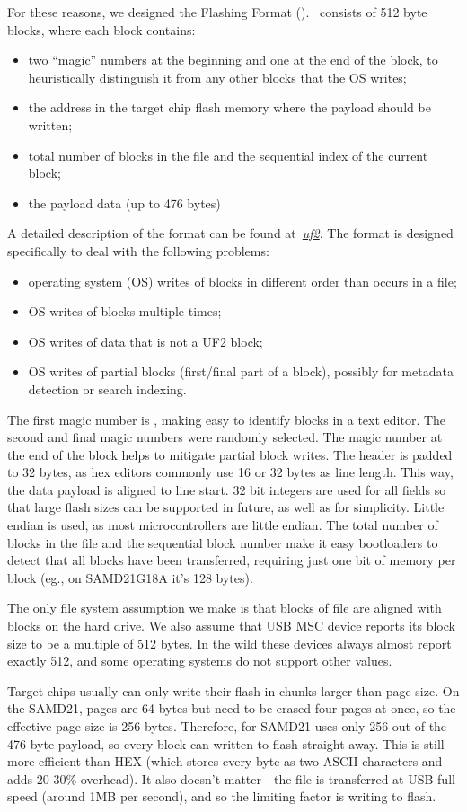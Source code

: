 For these reasons, we designed the Flashing Format (\UF). \ consists of 512 byte blocks, where each block contains:
\begin{itemize}
\item two ``magic'' numbers at the beginning and one at the end of the block,
to heuristically distinguish it from any other blocks that the OS writes;
\item the address in the target chip flash memory where the payload should be written;
\item total number of blocks in the file and the sequential index of the current block;
\item the payload data (up to 476 bytes)
\end{itemize}
A detailed description of the format can be found at~\emph{\href{https://github.com/microsoft/uf2}{uf2}}.
The format is designed specifically to deal with the following problems:
\begin{itemize}
\item operating system (OS) writes of blocks in different order than occurs in a file;
\item OS writes of blocks multiple times;
\item OS writes of data that is not a UF2 block;
\item OS writes of partial blocks (first/final part of a block), possibly for metadata detection or search indexing.
\end{itemize}

The first magic number is \texttt{\UFN}, making easy to identify \UF blocks in a text editor.
The second and final magic numbers were randomly selected.
The magic number at the end of the block helps to mitigate partial block writes.
The \UF header is padded to 32 bytes, as hex editors commonly use 16 or 32 bytes as line length. 
This way, the data payload is aligned to line start. 32 bit integers are used for all fields so that 
large flash sizes can be supported in future, as well as for simplicity.
Little endian is used, as most microcontrollers are little endian. 
The total number of blocks in the file and the sequential block number make it easy 
bootloaders to detect that all blocks have been transferred, requiring just one bit of 
memory per block (eg., on SAMD21G18A it's 128 bytes).

The only file system assumption we make is that blocks of file are aligned with blocks on the hard drive. 
We also assume that USB MSC device reports its block size to be a multiple of 512 bytes. 
In the wild these devices always almost report exactly 512, and some 
operating systems do not support other values.

Target chips usually can only write their flash in chunks larger than page size. On the SAMD21, pages are 64 bytes 
but need to be erased four pages at once, so the effective page size is 256 bytes. Therefore, \UF for SAMD21 uses 
only 256 out of the 476 byte payload, so every block can written to flash straight away. This is still more 
efficient than HEX (which stores every byte as two ASCII characters and adds 20-30\% overhead). It also doesn’t 
matter - the file is transferred at USB full speed (around 1MB per second), and so the limiting factor is writing 
to flash.
